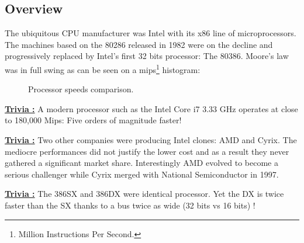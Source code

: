 \documentclass[book.tex]{subfiles}
\begin{document}
  \subsection{Overview}
  The ubiquitous CPU manufacturer was Intel with its x86 line of microprocessors.  The machines based on the 80286 released in 1982 were on the decline and progressively replaced by Intel's first 32 bits processor: The 80386. Moore's law was in full swing as can be seen on a mips\footnote{Million Instructions Per Second.} histogram:




\begin{figure}[H]
\centering
   \caption{Processor speeds comparison.} \label{fig:mips}
 \end{figure}

 \textbf{\underline{Trivia :}} A modern processor such as the Intel Core i7 3.33 GHz operates at close to 180,000 Mips: Five orders of magnitude faster!

 \bigskip

\textbf{\underline{Trivia :}}  Two other companies were producing Intel clones: AMD and Cyrix. The mediocre performances did not justify the lower cost and as a result they never gathered a significant market share. Interestingly AMD evolved to become a serious challenger while Cyrix merged with National Semiconductor in 1997.

 \bigskip
 
 \textbf{\underline{Trivia :}} The 386SX and 386DX were identical processor. Yet the DX is twice faster than the SX thanks to a bus twice as wide (32 bits vs 16 bits) !
\end{document}
